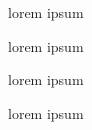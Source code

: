 


lorem ipsum
{\smaller 
\begin{myenumerate}
\item{} lorem ipsum
\item{} lorem ipsum
\end{myenumerate}
}
lorem ipsum




